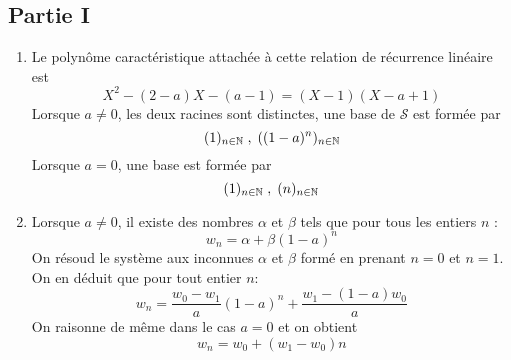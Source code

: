 \subsection*{Partie I}
\begin{enumerate}
\item Le polynôme caractéristique attachée à cette relation de récurrence linéaire est
\[X^2-(2-a)X-(a-1)=(X-1)(X-a+1)\]
Lorsque $a\neq 0$, les deux racines sont distinctes, une base de $\mathcal S$ est formée par
\[(1)_{n\in\mathbb{N}} \; , \; ((1-a)^n)_{n\in\mathbb{N}}\]
Lorsque $a=0$, une base est formée par
\[(1)_{n\in\mathbb{N}} \; , \; (n)_{n\in\mathbb{N}}\]
\item Lorsque $a\neq 0$, il existe des nombres $\alpha$ et $\beta$ tels que pour tous les entiers $n$ :
\[w_n = \alpha + \beta (1-a)^n\]
On résoud le système aux inconnues $\alpha$ et $\beta$ formé en prenant $n=0$ et $n=1$. On en déduit que pour tout entier $n$:
\[w_n = \frac{w_0 - w_1}{a}(1-a)^n + \frac{w_1-(1-a)w_0}{a}\]
On raisonne de même dans le cas $a=0$ et on obtient
\[w_n = w_0  + (w_1-w_0)n\]
\end{enumerate}
